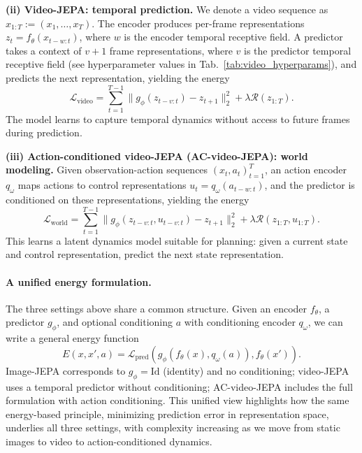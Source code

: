 \documentclass{article}
\begin{document}
\textbf{(ii) Video-JEPA: temporal prediction.}
We denote a video sequence as $x_{1:T}:=(x_1, \ldots, x_T)$. The encoder produces per-frame representations $z_t = f_\theta(x_{t-w:t})$, where $w$ is the encoder temporal receptive field.
A predictor takes a context of $v+1$ frame representations, where $v$ is the predictor temporal receptive field (see hyperparameter values in Tab.~\ref{tab:video_hyperparams}), and predicts the next representation, yielding the energy
\begin{equation}
\mathcal{L}_{\text{video}} = \sum_{t=1}^{T-1} \|g_\phi(z_{t-v:t}) - z_{t+1}\|_2^2 + \lambda \mathcal{R}(z_{1:T}).
\label{eq:video_jepa_energy}
\end{equation}
The model learns to capture temporal dynamics without access to future frames during prediction.

\textbf{(iii) Action-conditioned video-JEPA (AC-video-JEPA): world modeling.}
Given observation-action sequences $(x_t, a_t)_{t=1}^T$, an action encoder $q_\omega$ maps actions to control representations $u_t = q_\omega(a_{t-w:t})$, and the predictor is conditioned on these representations, yielding the energy
\begin{equation}
\mathcal{L}_{\text{world}} = \sum_{t=1}^{T-1} \|g_\phi(z_{t-v:t}, u_{t-v:t}) - z_{t+1}\|_2^2 + \lambda \mathcal{R}(z_{1:T}, u_{1:T}).
\label{eq:ac_video_jepa_energy}
\end{equation}
This learns a latent dynamics model suitable for planning: given a current state and control representation, predict the next state representation.

\paragraph{A unified energy formulation.}
The three settings above share a common structure. Given an encoder $f_\theta$, a predictor $g_\phi$, and optional conditioning $a$ with conditioning encoder $q_\omega$, we can write a general energy function
\begin{equation}
E(x, x', a) = \mathcal{L}_{\text{pred}}(g_\phi(f_\theta(x), q_\omega(a)), f_\theta(x')).
\label{eq:energy}
\end{equation}
Image-JEPA corresponds to $g_\phi = \text{Id}$ (identity) and no conditioning; video-JEPA uses a temporal predictor without conditioning; AC-video-JEPA includes the full formulation with action conditioning.
This unified view highlights how the same energy-based principle, minimizing prediction error in representation space, underlies all three settings, with complexity increasing as we move from static images to video to action-conditioned dynamics.
\end{document}
